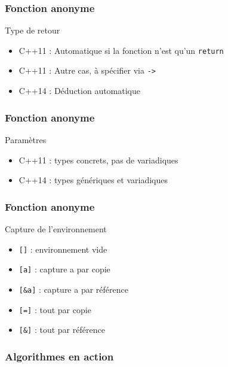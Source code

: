 \documentclass[svgnames]{beamer}
\begin{document}
\frame
{
  \frametitle{Fonction anonyme}
  \begin{block}{Type de retour}
  \begin{itemize}
  \item C++11 : Automatique si la fonction n'est qu'un \texttt{return}
  \item C++11 : Autre cas, \`a sp\'ecifier via \texttt{->}
  \item C++14 : D\'eduction automatique
  \end{itemize}  
  \end{block}
}

\frame
{
  \frametitle{Fonction anonyme}
  \begin{block}{Param\`etres}
  \begin{itemize}
  \item C++11 : types concrets, pas de variadiques\\

  \item C++14 : types g\'en\'eriques et variadiques\\
  \end{itemize}
  \end{block}
}

\frame
{
  \frametitle{Fonction anonyme}
  \begin{block}{Capture de l'environnement}
  \begin{itemize}
  \item \texttt{[]} : environnement vide
  \item \texttt{[a]} : capture a par copie
  \item \texttt{[\&a]} : capture a par r\'ef\'erence
  \item \texttt{[=]} : tout par copie
  \item \texttt{[\&]} : tout par r\'ef\'erence
  \end{itemize}
  \end{block}

}

\frame
{
  \frametitle{Algorithmes en action}
}
\end{document}
